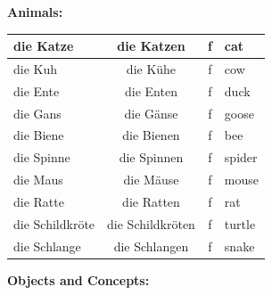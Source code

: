 \bigskip
\noindent\textbf{Animals:}

\begin{center}
\begin{tabular}{|l|c|c|l|}
\hline
die Katze & die Katzen & f & cat \\ \hline
die Kuh & die Kühe & f & cow \\ \hline
die Ente & die Enten & f & duck \\ \hline
die Gans & die Gänse & f & goose \\ \hline
die Biene & die Bienen & f & bee \\ \hline
die Spinne & die Spinnen & f & spider \\ \hline
die Maus & die Mäuse & f & mouse \\ \hline
die Ratte & die Ratten & f & rat \\ \hline
die Schildkröte & die Schildkröten & f & turtle \\ \hline
die Schlange & die Schlangen & f & snake \\ \hline
\end{tabular}
\end{center}

\bigskip
\noindent\textbf{Objects and Concepts:}

